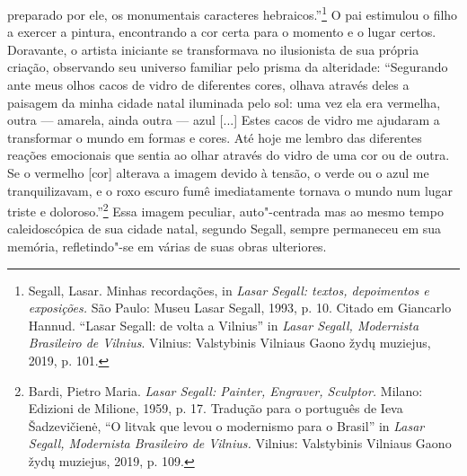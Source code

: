 preparado por ele, os monumentais caracteres hebraicos.''\footnote{Segall,
  Lasar. Minhas recordações, in \emph{Lasar Segall: textos, depoimentos
  e exposições.} São Paulo: Museu Lasar Segall, 1993, p. 10. Citado em
  Giancarlo Hannud. ``Lasar Segall: de volta a Vilnius'' in \emph{Lasar
  Segall, Modernista Brasileiro de Vilnius}. Vilnius: Valstybinis
  Vilniaus Gaono žydų muziejus, 2019, p. 101.} O pai estimulou o filho a
exercer a pintura, encontrando a cor certa para o momento e o lugar
certos. Doravante, o artista iniciante se transformava no ilusionista de
sua própria criação, observando seu universo familiar pelo prisma da
alteridade: ``Segurando ante meus olhos cacos de vidro de diferentes
cores, olhava através deles a paisagem da minha cidade natal iluminada
pelo sol: uma vez ela era vermelha, outra --- amarela, ainda outra ---
azul {[}...{]} Estes cacos de vidro me ajudaram a transformar o mundo em
formas e cores. Até hoje me lembro das diferentes reações emocionais que
sentia ao olhar através do vidro de uma cor ou de outra. Se o vermelho
{[}cor{]} alterava a imagem devido à tensão, o verde ou o azul me
tranquilizavam, e o roxo escuro fumê imediatamente tornava o mundo num
lugar triste e doloroso.''\footnote{Bardi, Pietro Maria. \emph{Lasar
  Segall: Painter, Engraver, Sculptor.} Milano: Edizioni de Milione,
  1959, p. 17. Tradução para o português de Ieva Šadzevičienė, ``O
  litvak que levou o modernismo para o Brasil'' in \emph{Lasar Segall,
  Modernista Brasileiro de Vilnius.} Vilnius: Valstybinis Vilniaus Gaono
  žydų muziejus, 2019, p. 109.} Essa imagem peculiar, auto"-centrada mas
ao mesmo tempo caleidoscópica de sua cidade natal, segundo Segall,
sempre permaneceu em sua memória, refletindo"-se em várias de suas obras
ulteriores.

